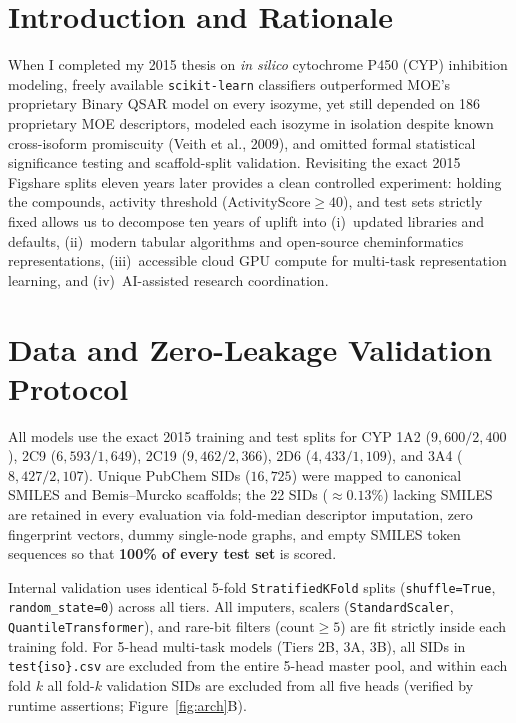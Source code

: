 \documentclass[11pt]{article}
\begin{document}
\section{Introduction and Rationale}
When I completed my 2015 thesis on \emph{in silico} cytochrome P450 (CYP) inhibition modeling, freely available \texttt{scikit-learn} classifiers outperformed MOE's proprietary Binary QSAR model on every isozyme, yet still depended on 186 proprietary MOE descriptors, modeled each isozyme in isolation despite known cross-isoform promiscuity (Veith et al., 2009), and omitted formal statistical significance testing and scaffold-split validation. Revisiting the exact 2015 Figshare splits eleven years later provides a clean controlled experiment: holding the compounds, activity threshold ($\text{ActivityScore} \ge 40$), and test sets strictly fixed allows us to decompose ten years of uplift into (i)~updated libraries and defaults, (ii)~modern tabular algorithms and open-source cheminformatics representations, (iii)~accessible cloud GPU compute for multi-task representation learning, and (iv)~AI-assisted research coordination.

\section{Data and Zero-Leakage Validation Protocol}
All models use the exact 2015 training and test splits for CYP 1A2 ($9{,}600 / 2{,}400$), 2C9 ($6{,}593 / 1{,}649$), 2C19 ($9{,}462 / 2{,}366$), 2D6 ($4{,}433 / 1{,}109$), and 3A4 ($8{,}427 / 2{,}107$). Unique PubChem SIDs ($16{,}725$) were mapped to canonical SMILES and Bemis--Murcko scaffolds; the 22 SIDs ($\approx 0.13\%$) lacking SMILES are retained in every evaluation via fold-median descriptor imputation, zero fingerprint vectors, dummy single-node graphs, and empty SMILES token sequences so that \textbf{100\% of every test set} is scored.

Internal validation uses identical 5-fold \texttt{StratifiedKFold} splits (\texttt{shuffle=True}, \texttt{random\_state=0}) across all tiers. All imputers, scalers (\texttt{StandardScaler}, \texttt{QuantileTransformer}), and rare-bit filters ($\text{count} \ge 5$) are fit strictly inside each training fold. For 5-head multi-task models (Tiers 2B, 3A, 3B), all SIDs in \texttt{test\{iso\}.csv} are excluded from the entire 5-head master pool, and within each fold $k$ all fold-$k$ validation SIDs are excluded from all five heads (verified by runtime assertions; Figure~\ref{fig:arch}B).
\end{document}
